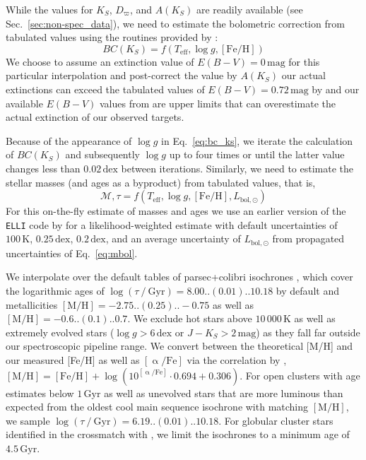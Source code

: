 \documentclass[
  journal=pasa,
  manuscript=research-paper, %
  year=2023,
  volume=37
]{cup-journal}
\begin{document}
While the values for $K_S$, $D_\varpi$, and $A(K_S)$ are readily available (see Sec.~\ref{sec:non-spec_data}), we need to estimate the bolometric correction from tabulated values using the routines provided by \citet{Casagrande2018}:
\begin{equation}
BC(K_S) = f(T_\mathrm{eff}, \log g, \mathrm{[Fe/H]})
\label{eq:bc_ks}
\end{equation}
We choose to assume an extinction value of $E(B-V) = 0\,\mathrm{mag}$ for this particular interpolation and post-correct the value by $A(K_S)$ our actual extinctions can exceed the tabulated values of $E(B-V) = 0.72\,\mathrm{mag}$ by \citet{Casagrande2018} and our available $E(B-V)$ values from \citet{Schlegel1998} are upper limits that can overestimate the actual extinction of our observed targets.

Because of the appearance of $\log g$ in Eq.~\ref{eq:bc_ks}, we iterate the calculation of $BC(K_S)$ and subsequently $\log g$ up to four times or until the latter value changes less than $0.02\,\mathrm{dex}$ between iterations. Similarly, we need to estimate the stellar masses (and ages as a byproduct) from tabulated values, that is,
\begin{equation}
\mathcal{M}, \tau = f(T_\mathrm{eff}, \log g, \mathrm{[Fe/H]}, L_\mathrm{bol,\odot})
\label{eq:mass_age}
\end{equation}
For this on-the-fly estimate of masses and ages we use an earlier version of the \texttt{ELLI} code by \cite{Lin2018} for a likelihood-weighted estimate with default uncertainties of $100\,\mathrm{K}$, $0.25\,\mathrm{dex}$, $0.2\,\mathrm{dex}$, and an average uncertainty of $L_\mathrm{bol,\odot}$ from propagated uncertainties of Eq.~\ref{eq:mbol}.

We interpolate over the default tables of {\sc parsec+colibri} isochrones \citep{Bressan2012, Marigo2017}, which cover the logarithmic ages of $\log (\tau~/~\mathrm{Gyr}) = 8.00..(0.01)..10.18$ by default and metallicities $\mathrm{[M/H]} = -2.75..(0.25)..-0.75$ as well as $\mathrm{[M/H]} = -0.6..(0.1)..0.7$. We exclude hot stars above $10\,000\,\mathrm{K}$ as well as extremely evolved stars ($\log g > 6\,\mathrm{dex}$ or $J - K_S > 2\,\mathrm{mag}$) as they fall far outside our spectroscopic pipeline range. We convert between the theoretical [M/H] and our measured [Fe/H] as well as $\mathrm{[\upalpha/Fe]}$ via the correlation by \citet{Salaris2006}, $\mathrm{[M/H]} = \mathrm{[Fe/H]} + \log\left(10^{\mathrm{[\upalpha/Fe]}} \cdot 0.694 + 0.306 \right)$. For open clusters with age estimates below $1\,\mathrm{Gyr}$ as well as unevolved stars that are more luminous than expected from the oldest cool main sequence isochrone with matching $\mathrm{[M/H]}$, we sample $\log (\tau~/~\mathrm{Gyr}) = 6.19..(0.01)..10.18$. For globular cluster stars identified in the crossmatch with \citet{Baumgardt2021}, we limit the isochrones to a minimum age of $4.5\,\mathrm{Gyr}$.
\end{document}
